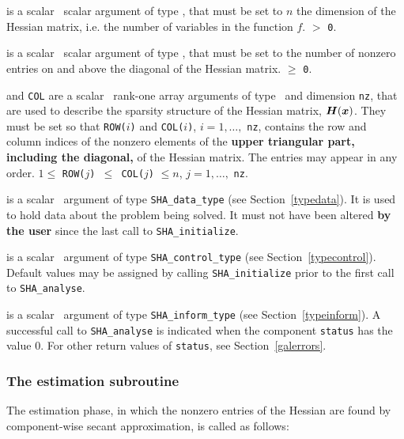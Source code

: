 \documentclass{galahad}
\newcommand{\packagename}{SHA}
\begin{document}
\vspace*{-2mm}
\begin{description}
is a scalar \intentin\ scalar argument of type \integer, that must be
set to $n$ the dimension of the Hessian matrix, i.e. the number of
variables in the function $f$.
 $>$ {\tt 0}.

is a scalar \intentin\ scalar argument of type \integer, that must be
set to the number of nonzero entries on and above the diagonal of the Hessian
matrix.
 $\ge$ {\tt 0}.

 and {\tt COL} are a scalar \intentin\ rank-one array arguments
of type  \integer\ and dimension {\tt nz}, that are used to describe
the sparsity structure of the Hessian matrix, ${\bm{H}}({\bm{x}})$.
They must be set so that
{\tt ROW(}$i${\tt)} and {\tt COL(}$i${\tt)}, $i = 1, \ldots,$ {\tt nz},
contains the row and column indices of the nonzero elements of the
{\bf upper triangular part, including the diagonal,} of the Hessian matrix.
The entries may appear in any order.
\restrictions
$1 \leq$ {\tt ROW(}$j${\tt) $\leq$ COL(}$j${\tt)} $\leq n$,
$j = 1, \ldots,$ {\tt nz}.

 is a scalar \intentinout\ argument of type
{\tt \packagename\_data\_type}
(see Section~\ref{typedata}). It is used to hold data about the problem being
solved. It must not have been altered {\bf by the user} since the last call to
{\tt \packagename\_initialize}.

 is a scalar \intentin\ argument of type
{\tt \packagename\_control\_type}
(see Section~\ref{typecontrol}). Default values may be assigned by calling
{\tt \packagename\_initialize} prior to the first call to
{\tt \packagename\_analyse}.

 is a scalar \intentinout\ argument of type
{\tt \packagename\_inform\_type}
(see Section~\ref{typeinform}).
A successful call to
{\tt \packagename\_analyse}
is indicated when the  component {\tt status} has the value 0.
For other return values of {\tt status}, see Section~\ref{galerrors}.

\end{description}


\subsubsection{The estimation subroutine}
The estimation phase, in which the nonzero entries of the Hessian
are found by component-wise secant approximation, is called as follows:
\vspace*{1mm}
\end{document}
